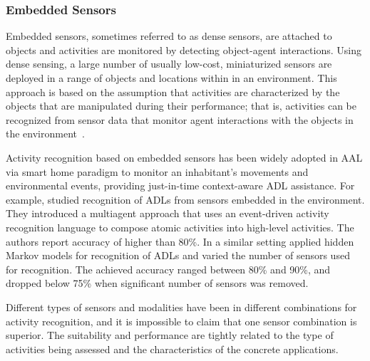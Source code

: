 \subsubsection{Embedded Sensors}

Embedded sensors, sometimes referred to as dense sensors, are attached to objects and activities are monitored by detecting object-agent interactions. Using dense sensing, a large number of usually low-cost, miniaturized sensors are deployed in a range of objects and locations within in an environment. This approach is based on the assumption that activities are characterized by the objects that are manipulated during their performance; that is, activities can be recognized from sensor data that monitor agent interactions with the objects in the environment~\citep{Chen2012}. 

Activity recognition based on embedded sensors has been widely adopted in AAL via smart home paradigm to monitor an inhabitant's movements and environmental events, providing just-in-time context-aware ADL assistance. For example,
\cite{Storf} studied recognition of ADLs from sensors embedded in the environment. They introduced a multiagent approach that uses an event-driven activity recognition language to compose atomic activities into high-level activities. The authors report accuracy of higher than 80\%.  In a similar setting \cite{Cook2012} applied hidden Markov models for recognition of ADLs and varied the number of sensors used for recognition. The achieved accuracy ranged between 80\% and 90\%, and dropped below 75\% when significant number of sensors was removed.

Different types of sensors and modalities have been in different combinations for activity recognition, and it is impossible to claim that one sensor combination is superior. The suitability and performance are tightly related to the type of activities being assessed and the characteristics of the concrete applications.




